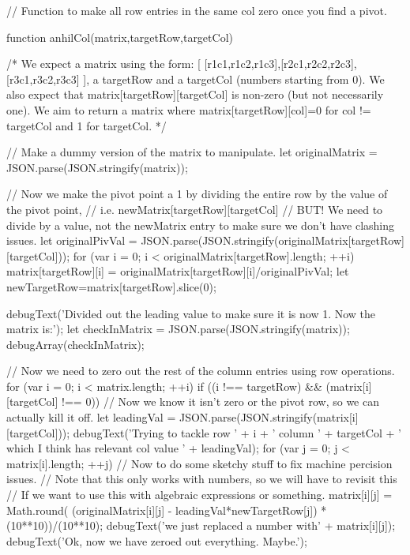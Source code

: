 \documentclass{ximera}
\begin{document}
\begin{javascript}
// Function to make all row entries in the same col zero once you find a pivot.

function anhilCol(matrix,targetRow,targetCol) {
    /*
        We expect a matrix using the form: [ [r1c1,r1c2,r1c3],[r2c1,r2c2,r2c3],[r3c1,r3c2,r3c3] ], 
            a targetRow and a targetCol (numbers starting from 0).
        We also expect that matrix[targetRow][targetCol] is non-zero (but not necessarily one).
        We aim to return a matrix where matrix[targetRow][col]=0 for col != targetCol and 1 for targetCol.
    */
    
    // Make a dummy version of the matrix to manipulate.
    let originalMatrix = JSON.parse(JSON.stringify(matrix));
    
    // Now we make the pivot point a 1 by dividing the entire row by the value of the pivot point,
    //  i.e. newMatrix[targetRow][targetCol]
    //      BUT! We need to divide by a value, not the newMatrix entry to make sure we don't have clashing issues.
    let originalPivVal = JSON.parse(JSON.stringify(originalMatrix[targetRow][targetCol]));
    for (var i = 0; i < originalMatrix[targetRow].length; ++i) {
        matrix[targetRow][i] = originalMatrix[targetRow][i]/originalPivVal;
    }
    let newTargetRow=matrix[targetRow].slice(0);
    
    debugText('Divided out the leading value to make sure it is now 1. Now the matrix is:');
    let checkInMatrix = JSON.parse(JSON.stringify(matrix));
    debugArray(checkInMatrix);
    
    // Now we need to zero out the rest of the column entries using row operations.
    for (var i = 0; i < matrix.length; ++i) {
        if ((i !== targetRow) && (matrix[i][targetCol] !== 0)) {
            // Now we know it isn't zero or the pivot row, so we can actually kill it off.
            let leadingVal = JSON.parse(JSON.stringify(matrix[i][targetCol]));
            debugText('Trying to tackle row ' + i + ' column ' + targetCol + ' which I think has relevant col value ' + leadingVal);
            for (var j = 0; j < matrix[i].length; ++j) {
                // Now to do some sketchy stuff to fix machine percision issues.
                //  Note that this only works with numbers, so we will have to revisit this
                //  If we want to use this with algebraic expressions or something.
                matrix[i][j] = Math.round( (originalMatrix[i][j] - leadingVal*newTargetRow[j]) * (10**10))/(10**10);
                debugText('we just replaced a number with' + matrix[i][j]);
            }
        }
    }
    debugText('Ok, now we have zeroed out everything. Maybe.');
    
}
\end{javascript}
\end{document}
